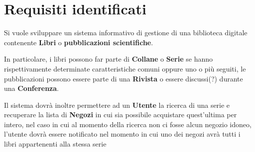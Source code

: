 \chapter{Requisiti identificati}
Si vuole sviluppare un sistema informativo di gestione di una biblioteca digitale contenente \textbf{Libri} o
\textbf{pubblicazioni scientifiche}.

In particolare, i libri possono far parte di \textbf{Collane} o \textbf{Serie} se hanno rispettivamente determinate caratteristiche
comuni oppure uno o più seguiti, le pubblicazioni possono essere parte di una \textbf{Rivista} o essere discussi(?) 
durante una \textbf{Conferenza}.

Il sistema dovrà inoltre permettere ad un \textbf{Utente} la ricerca di una serie
e recuperare la lista di \textbf{Negozi} in cui sia possibile acquistare quest'ultima per intero,
nel caso in cui al momento della ricerca non ci fosse alcun negozio idoneo, l'utente dovrà essere
notificato nel momento in cui uno dei negozi avrà tutti i libri appartenenti alla stessa serie